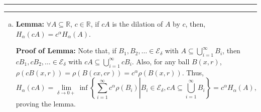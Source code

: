 \documentclass[11pt]{article}
\newcounter{questionCounter}
\newcounter{partCounter}[questionCounter]
\newenvironment{question}[2][\arabic{questionCounter}]{%
    \setcounter{partCounter}{0}%
    \vspace{.25in} \hrule \vspace{0.5em}%
        \noindent{\bf #2}%
    \vspace{0.8em} \hrule \vspace{.10in}%
    \addtocounter{questionCounter}{1}%
}{}
\renewcommand{\qed}{\quad $\blacksquare$}
\begin{document}
\begin{question}{Problem 4}
\begin{enumerate}[(a)]
{\bf Proof of Lemma:} Let $\delta > 0$.
Because $H_{\alpha,\delta}$ is an infimum, we can find a sequence of balls
$B(x_1,r_1),B(x_2,r_2),\ldots \in \mathcal{E}_{\delta}$, with
$S \subseteq \bigcup_{i = 1}^{\infty} B(x_i,r_i)$, such that
\[\sum_{i = 1}^{\infty} c_{\alpha} r_i^{\alpha}
 = \sum_{i = 1}^{\infty} \rho(B(x_i,r_i))
 \leq H_{s,\delta + 1}.\]
Furthermore, since $H_{\alpha,\delta}$ is an infimum and $\mathcal{E}_{\delta}$
becomes smaller as $\delta$ decreases, $H_{\alpha,\delta}$ increases as $\delta$
decreases. Thus, taking the limit as $\delta \rightarrow 0^+$,
\[\sum_{i = 1}^{\infty} c_{\alpha} r_i^{\alpha}
 \leq H_{\alpha,\delta}(S) + 1
 \leq H_{\alpha}(S) + 1.
\]

Therefore,
\begin{eqnarray*}
H_{\beta,\delta}(S)
 & \leq & \sum_{i = 1}^{\infty} c_{\beta}r_i^{\beta}
   \leq   \frac{c_{\beta}}{c_{\alpha}}
        \sum_{i = 1}^{\infty} c_{\alpha} r_i^{\alpha}r_i^{\beta - \alpha} \\
 & \leq & \frac{c_{\beta}}{c_{\alpha}} \delta^{\beta - \alpha}
        \sum_{i = 1}^{\infty} c_{\alpha}r_i^{\alpha}
                                    \quad \mbox{\quad(each $r_i \leq \delta$)}\\
 & \leq & \frac{c_{\beta}}{c_{\alpha}} \delta^{\beta - \alpha}(H_{\alpha}(S) + 1).
\end{eqnarray*}

Since $H_{\alpha}(S) < \infty$ and $\beta > \alpha$, taking the limit as
$\delta \rightarrow 0$ proves the lemma.

Let $d = \sup\{\alpha \in [0,\infty] | H^*_{\alpha}(S) = \infty\}$. Suppose
$\alpha \in (d,\infty)$. By choice of $d$, for
$\beta = \frac{\alpha - d}{2} > d$, $H_{\beta}(S) < \infty$, so that, by the
above lemma, $H_{\alpha}(S) = 0$. On the other hand, suppose $\alpha \in (0,d)$.
By the above lemma, if $H_{\alpha}(S) \neq \infty$, then,
$\forall \beta \in (\alpha,d]$, $H_{\beta}(S) = 0$, contradicting the choice
of $d$ as the supremum. Thus, $d$ has the desired properties. Note $d$ is
unique, as, if $d^{\prime} \neq d$ (without loss of generality,
$d^{\prime} > d$), also had the desired properties, then, for
$\alpha \in (d,d^{\prime}$, $\alpha = 0$ and $\alpha = \infty$, which is
impossible. \qed

\item {\bf Lemma:} $\forall A \subseteq \mathbb{R}$, $c \in \mathbb{R}$, if
$cA$ is the dilation of $A$ by $c$, then,
$H_{\alpha}(cA) = c^{\alpha}H_{\alpha}(A)$.

{\bf Proof of Lemma:} Note that, if $B_1,B_2,\ldots \in \mathcal{E}_{\delta}$
with $A \subseteq \bigcup_{i = 1}^{\infty} B_i$, then
$cB_1,cB_2,\ldots \in \mathcal{E}_{\delta}$ with
$cA \subseteq \bigcup_{i = 1}^{\infty} cB_i$. Also, for any ball $B(x,r)$,
$\rho(cB(x,r)) = \rho(B(cx,cr)) = c^{\alpha}\rho(B(x,r))$. Thus,
\[H_{\alpha}(cA)
 = \lim_{\delta \rightarrow 0+} \inf
        \left\{\sum_{i = 1}^{\infty} c^{\alpha}\rho(B_i) \right|
        \left.B_i \in \mathcal{E}_{\delta},
            cA \subseteq \bigcup_{i = 1}^{\infty} B_i \right\}
 = c^{\alpha}H_{\alpha}(A),
\]
proving the lemma.


\end{enumerate}
\end{question}
\end{document}
